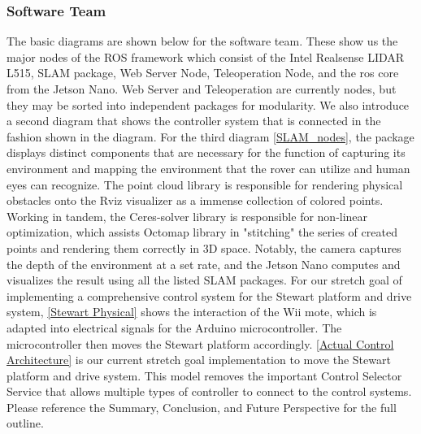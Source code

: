 \documentclass[a4paper, 10pt]{article}
\begin{document}
        \subsubsection*{Software Team}
        The basic diagrams are shown below for the software team. These show us the major nodes of the ROS framework which consist of the Intel Realsense LIDAR L515, SLAM package, Web Server Node, Teleoperation Node, and the ros core from the Jetson Nano. Web Server and Teleoperation are currently nodes, but they may be sorted into independent packages for modularity.
        We also introduce a second diagram that shows the controller system that is connected in the fashion shown in the diagram.
        For the third diagram \ref{SLAM_nodes}, the package displays distinct components that are necessary for the function of capturing its environment and mapping the environment that the rover can utilize and human eyes can recognize. The point cloud library is responsible for rendering physical obstacles onto the Rviz visualizer as a immense collection of colored points. Working in tandem, the Ceres-solver library is responsible for non-linear optimization, which assists Octomap library in "stitching" the series of created points and rendering them correctly in 3D space. Notably, the camera captures the depth of the environment at a set rate, and the Jetson Nano computes and visualizes the result using all the listed SLAM packages.
        For our stretch goal of implementing a comprehensive control system for the Stewart platform and drive system, \ref{Stewart Physical} shows the interaction of the Wii mote, which is adapted into electrical signals for the Arduino microcontroller. The microcontroller then moves the Stewart platform accordingly.
        \ref{Actual Control Architecture} is our current stretch goal implementation to move the Stewart platform and drive system. This model removes the important Control Selector Service that allows multiple types of controller to connect to the control systems. Please reference the Summary, Conclusion, and Future Perspective for the full outline.
        
\end{document}
